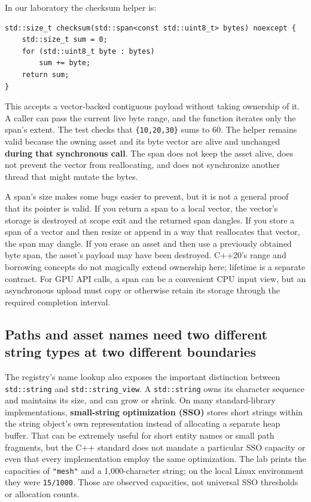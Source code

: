 In our laboratory the checksum helper is:

\begin{verbatim}
std::size_t checksum(std::span<const std::uint8_t> bytes) noexcept {
    std::size_t sum = 0;
    for (std::uint8_t byte : bytes)
        sum += byte;
    return sum;
}
\end{verbatim}

This accepts a vector-backed contiguous payload without taking ownership of it. A caller can pass the current live byte range, and the function iterates only the span's extent. The test checks that \texttt{\{10,20,30\}} sums to 60. The helper remains valid because the owning asset and its byte vector are alive and unchanged \textbf{during that synchronous call}. The span does not keep the asset alive, does not prevent the vector from reallocating, and does not synchronize another thread that might mutate the bytes.

A span's size makes some bugs easier to prevent, but it is not a general proof that its pointer is valid. If you return a span to a local vector, the vector's storage is destroyed at scope exit and the returned span dangles. If you store a span of a vector and then resize or append in a way that reallocates that vector, the span may dangle. If you erase an asset and then use a previously obtained byte span, the asset's payload may have been destroyed. C++20's range and borrowing concepts do not magically extend ownership here; lifetime is a separate contract. For GPU API calls, a span can be a convenient CPU input view, but an asynchronous upload must copy or otherwise retain its storage through the required completion interval.

\subsection{Paths and asset names need two different string types at two different boundaries}\label{05-engine-i-ch005-paths-and-asset-names-need-two-different-string-types-at-two-different-boundaries}

The registry's name lookup also exposes the important distinction between \texttt{std::string} and \texttt{std::string\_view}. A \texttt{std::string} owns its character sequence and maintains its size, and can grow or shrink. On many standard-library implementations, \textbf{small-string optimization (SSO)} stores short strings within the string object's own representation instead of allocating a separate heap buffer. That can be extremely useful for short entity names or small path fragments, but the C++ standard does not mandate a particular SSO capacity or even that every implementation employ the same optimization. The lab prints the capacities of \texttt{"mesh"} and a 1,000-character string; on the local Linux environment they were \texttt{15/1000}. Those are observed capacities, not universal SSO thresholds or allocation counts.

